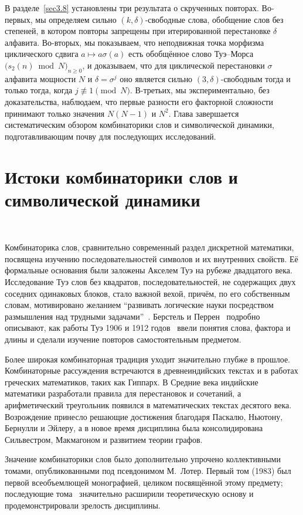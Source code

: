 \documentclass[a4paper,14pt]{extreport}
\theoremstyle{plain}
\theoremstyle{definition}
\theoremstyle{remark}
\begin{document}
В разделе~\ref{sec3.8} установлены три результата о скрученных повторах. Во-первых, мы определяем сильно $(k,\delta)$-свободные слова, обобщение слов без степеней, в котором повторы запрещены при итерированной перестановке $\delta$ алфавита.
Во-вторых, мы показываем, что неподвижная точка морфизма циклического сдвига $a\mapsto a\sigma(a)$ есть обобщённое слово Туэ--Морса $\bigl(s_2(n)\bmod N\bigr)_{n\ge0}$, и доказываем, что для циклической перестановки $\sigma$ алфавита мощности $N$ и $\delta=\sigma^j$ оно является сильно $(3,\delta)$-свободным тогда и только тогда, когда $j\not\equiv1 \pmod N$.
В-третьих, мы экспериментально, без доказательства, наблюдаем, что первые разности его факторной сложности принимают только значения $N(N-1)$ и $N^2$. Глава завершается систематическим обзором комбинаторики слов и символической динамики, подготавливающим почву для последующих исследований.	
\section{Истоки комбинаторики слов и символической динамики}~\label{sec1.1}

Комбинаторика слов, сравнительно современный раздел дискретной 
математики, посвящена изучению последовательностей символов и их внутренних свойств. Её формальные основания были заложены Акселем Туэ на рубеже двадцатого века. Исследование Туэ слов без квадратов, последовательностей, не содержащих двух соседних одинаковых блоков, стало важной вехой, причём, по его собственным словам, мотивировано желанием ``развивать логические науки посредством размышления над трудными задачами''~\cite{Perrin}. Берстель и Перрен~\cite{Perrin} подробно описывают, как работы Туэ 1906 и 1912 годов~\cite{Thue} ввели понятия слова, фактора и длины и сделали изучение повторов самостоятельным предметом.

Более широкая комбинаторная традиция уходит значительно глубже в прошлое. Комбинаторные рассуждения встречаются в древнеиндийских текстах 
и в работах греческих математиков, таких как Гиппарх. В Средние века индийские математики разработали правила для 
перестановок и сочетаний, а арифметический треугольник появился в математических текстах десятого века. Возрождение принесло решающие достижения благодаря Паскалю, Ньютону, Бернулли и Эйлеру, а в новое время дисциплина была консолидирована Сильвестром, Макмагоном и развитием теории графов.

Значение комбинаторики слов было дополнительно упрочено коллективными томами, опубликованными под псевдонимом М.~Лотер. 
Первый том (1983) был первой всеобъемлющей монографией, целиком посвящённой этому предмету; последующие тома~\cite{Lothaire2002} значительно расширили теоретическую основу и продемонстрировали зрелость дисциплины. 
\end{document}
